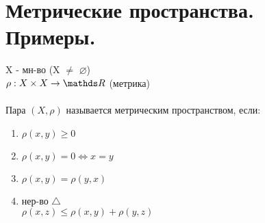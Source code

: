 \documentclass[geometry.tex]{subfiles}
\begin{document}
  \section{Метрические пространства. Примеры.}

  \begin{definition}
      X - мн-во (X $\neq$ $\varnothing$) \\
      $\rho: X \times X \rightarrow \R$ (метрика)\\ \\
      Пара $(X, \rho)$ называется метрическим пространством, если:
      \begin{enumerate}
          \item $\rho(x, y) \geq 0$
          \item $\rho(x, y) = 0 \Leftrightarrow x = y$
          \item $\rho(x, y) = \rho(y, x)$
          \item нер-во $\bigtriangleup$ \\ $\rho(x, z) \leq \rho(x, y) + \rho(y, z)$
      \end{enumerate}
  \end{definition}
\end{document}
